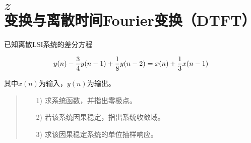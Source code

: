 \documentclass[cn, hazy, blue, normal, 12pt]{elegantnote}
\begin{document}
\section{$z$变换与离散时间Fourier变换（DTFT）}

\begin{exercise}

已知离散LSI系统的差分方程

\begin{equation}
\notag
    y(n)-\frac{3}{4}y(n-1)+\frac{1}{8}y(n-2)=x(n)+\frac{1}{3}x(n-1)
\end{equation}

其中$x(n)$为输入，$y(n)$为输出。

\begin{quote}
\begin{itemize}
    \item[1)] 求系统函数，并指出零极点。
    \item[2)] 若该系统因果稳定，指出系统收敛域。
    \item[3)] 求该因果稳定系统的单位抽样响应。 
\end{itemize}
\end{quote}

\end{exercise}
\end{document}
